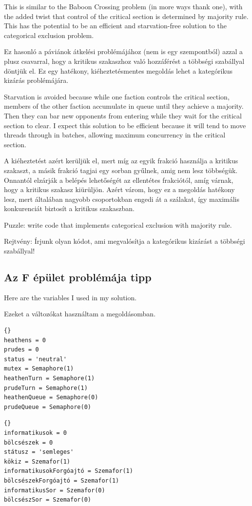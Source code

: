 \documentclass{book}
\newcommand{\clearemptydoublepage}{\newpage\cleardoublepage}
\begin{document}
This is similar to the Baboon Crossing problem (in more ways thank
one), with the added twist that control of the critical section is
determined by majority rule.  This has the potential to be an
efficient and starvation-free solution to the categorical exclusion
problem.

Ez hasonló a páviánok átkelési problémájához (nem is egy szempontból)
azzal a plusz csavarral, hogy a kritikus szakaszhoz való hozzáférést
a többségi szabállyal döntjük el. Ez egy hatékony, kiéheztetésmentes
megoldás lehet a kategórikus kizárás problémájára.

Starvation is avoided because while one faction controls the critical
section, members of the other faction accumulate in queue until they
achieve a majority.  Then they can bar new opponents from entering
while they wait for the critical section to clear.  I expect this
solution to be efficient because it will tend to move threads through
in batches, allowing maximum concurrency in the critical section.

A kiéheztetést azért kerüljük el, mert míg az egyik frakció használja
a kritikus szakaszt, a másik frakció tagjai egy sorban gyűlnek,
amig nem lesz többségük. Onnantól elzárják a belépés lehetőségét az ellentétes
frakciótól, amíg várnak, hogy a kritikus szakasz kiürüljön. Azért
várom, hogy ez a megoldás hatékony lesz, mert általában nagyobb
csoportokban engedi át a szálakat, így maximális konkurenciát
biztosít a kritikus szakaszban.

Puzzle: write code that implements categorical exclusion with
majority rule.

Rejtvény: Írjunk olyan kódot, ami megvalósítja a kategórikus
kizárást a többségi szabállyal!

\clearemptydoublepage
\subsection{Az F épület problémája tipp}

Here are the variables I used in my solution.

Ezeket a változókat használtam a megoldásomban.

\begin{lstlisting}[title={Modus problem hint}]{}
heathens = 0
prudes = 0
status = 'neutral'
mutex = Semaphore(1)
heathenTurn = Semaphore(1)
prudeTurn = Semaphore(1)
heathenQueue = Semaphore(0)
prudeQueue = Semaphore(0)
\end{lstlisting}

\begin{lstlisting}[title={Az F épület problémája tipp}]{}
informatikusok = 0
bölcsészek = 0
státusz = 'semleges'
kökiz = Szemafor(1)
informatikusokForgóajtó = Szemafor(1)
bölcsészekForgóajtó = Szemafor(1)
informatikusSor = Szemafor(0)
bölcsészSor = Szemafor(0)
\end{lstlisting}
\end{document}
